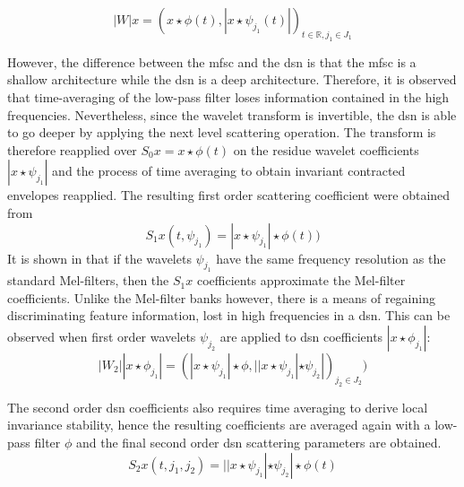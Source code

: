 \begin{equation}
|W|x=\left(x\star\phi(t),|x\star\psi_{j_1}(t)|\right)_{t\in\mathbb{R},j_1\in J_1} 
\label{eqn_c4_dss01}
\end{equation}

However, the difference between the \acrshort{mfsc} and the \acrfull{dsn} is that the \acrshort{mfsc} is a shallow architecture while the \acrshort{dsn} is a deep architecture.  Therefore, it is observed that time-averaging of the low-pass filter loses information contained in the high frequencies. Nevertheless, since the wavelet transform is invertible, the \acrshort{dsn} is able to go deeper by applying the next level scattering operation. The transform is therefore reapplied over $S_0x=x\star\phi(t)$ on the residue wavelet coefficients $|x\star\psi_{j_1}|$ and the process of time averaging to obtain invariant contracted envelopes reapplied.  The resulting first order scattering coefficient were obtained from
\begin{equation}
S_1x(t,\psi_{j_1})=|x \star\psi_{j_1}| \star\phi(t)\label{eqn_c4_dss03})
\label{eqn_c4_dss02}
\end{equation}
It is shown in \cite{anden2014deep} that if the wavelets $\psi_{j_1}$ have the same frequency resolution as the standard Mel-filters, then the $S_1x$ coefficients approximate the Mel-filter coefficients.  Unlike the Mel-filter banks however, there is a means of regaining discriminating feature information, lost in high frequencies in a \acrshort{dsn}.  This can be observed when first order wavelets $\psi_{j_2}$ are applied to \acrshort{dsn} coefficients $|x\star\phi_{j_1}|$:
\begin{equation}
|W_2||x\star\phi_{j_1}|=\left(|x\star\psi_{j_1}|\star\phi,||x\star\psi_{j_1}|\star\psi_{j_2}|\right)_{j_2\in J_2}
\label{eqn_c4_dss04})\end{equation}

The second order \acrshort{dsn} coefficients also requires time averaging to derive local invariance stability, hence the resulting coefficients are averaged again with a low-pass filter $\phi$ and the final second order \acrshort{dsn} scattering parameters are obtained.
 \begin{equation}
S_2x(t,j_1,j_2)=||x\star\psi_{j_1}|\star\psi_{j_2}|\star\phi(t)
\label{eqn_c4_dss04}\end{equation}

